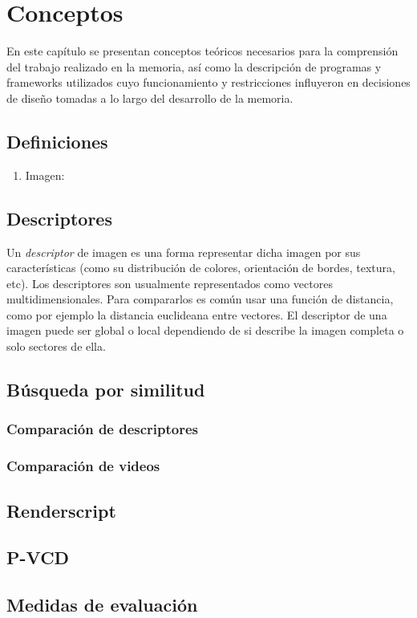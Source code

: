 \chapter{Conceptos}

En este capítulo se presentan conceptos teóricos necesarios para la comprensión del trabajo realizado en la memoria, así como la descripción de  programas y frameworks utilizados cuyo funcionamiento y restricciones influyeron en decisiones de diseño tomadas a lo largo del desarrollo de la memoria.

\section{Definiciones}
\begin{enumerate}
\item Imagen: 
\end{enumerate}

\section{Descriptores}
Un \emph{descriptor} de imagen es una forma representar dicha imagen por sus características (como su distribución de colores, orientación de bordes, textura, etc). Los descriptores son usualmente representados como vectores multidimensionales. Para compararlos es común usar una función de distancia, como por ejemplo la distancia euclideana entre vectores.
El descriptor de una imagen puede ser global o local dependiendo de si describe la imagen completa o solo sectores de ella.
\section{Búsqueda por similitud}
\subsection{Comparación de descriptores}
\subsection{Comparación de videos}
\section{Renderscript}
\section{P-VCD}
\section{Medidas de evaluación}

\lipsum[50-60]
